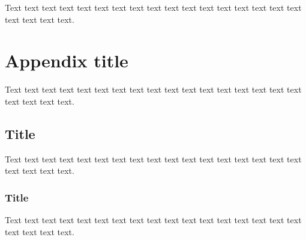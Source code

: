 \documentclass[preprint]{iucr}              %
\begin{document}
Text text text text text text text text text text text text text text
text text text text text text text.



\appendix
\section{Appendix title}

Text text text text text text text text text text text text text text
text text text text text text text.

\subsection{Title}

Text text text text text text text text text text text text text text
text text text text text text text.

\subsubsection{Title}

Text text text text text text text text text text text text text text
text text text text text text text.








\end{document}
